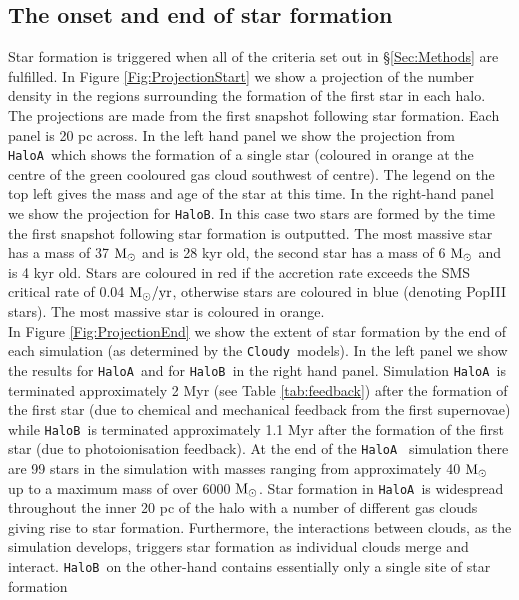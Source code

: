 \documentclass[graphics, twocolumn, usenatbib]{mn2e}
\newcommand{\cloudy}{\texttt{Cloudy~}}
\newcommand{\msolar} {$\rm{M_{\odot}}~$}
\newcommand{\msolarc} {$\rm{M_{\odot}}$}
\newcommand{\msolaryrc} {$\rm{M_{\odot}/yr}$}
\newcommand{\ha} {\texttt{HaloA~}}
\newcommand{\hb} {\texttt{HaloB~}}
\newcommand{\hbc} {\texttt{HaloB}}
\begin{document}



\subsection{The onset and end of star formation}
Star formation is triggered when all of the criteria set out in \S \ref{Sec:Methods} are
fulfilled. In Figure \ref{Fig:ProjectionStart} we show a projection of the number density in the
regions surrounding the formation of the first star in each halo. The projections are made from the
first snapshot following star formation. Each panel is 20 pc across. In the left hand panel we
show the projection from \ha which shows the formation of a single star (coloured in orange
at the centre of the green cooloured gas cloud southwest of centre). The legend on the top left gives the mass and
age of the star at this time.
In the right-hand panel we show the projection for \hbc. In this case two stars are formed by the time the first
snapshot following star formation is outputted. The most massive star has a mass of 37 \msolar and is 28 kyr old,
the second star has a mass of 6 \msolar and is 4 kyr old. Stars are coloured in red if the
accretion rate exceeds the SMS critical rate of 0.04 \msolaryrc, otherwise 
stars are coloured in blue (denoting PopIII stars). The most massive star is
coloured in orange. \\
\indent In Figure \ref{Fig:ProjectionEnd} we show the extent of star formation by the end of each
simulation (as determined by the \cloudy models). In the left panel we show the results for \ha and
for \hb in the right hand panel. Simulation \ha is terminated approximately 2 Myr (see Table \ref{tab:feedback})
after the formation of the first
star (due to chemical and mechanical feedback from the first supernovae) while \hb is terminated approximately
1.1 Myr after the formation of the first star (due to photoionisation feedback). At the end of the \ha
simulation there are 99 stars in the simulation with masses ranging from approximately 40 \msolar
up to a maximum mass of over 6000 \msolarc.  Star formation in \ha is widespread throughout the
inner 20 pc of the halo with a number of different gas clouds giving rise to star formation. Furthermore, the interactions between clouds, as the simulation develops, triggers star formation as individual clouds
merge and interact. \hb on the other-hand contains essentially only a single site of star formation
\end{document}
